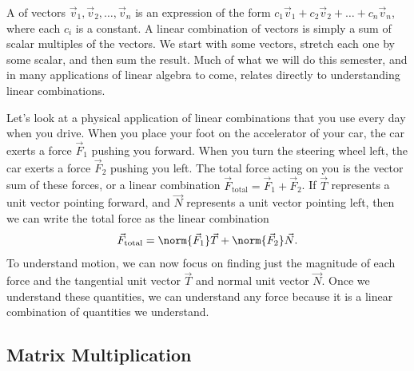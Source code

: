 A  of vectors $\vec v_{1}, \vec v_{2}, \ldots, \vec v_{n}$ is an expression of the form {$c_1\vec v_{1}+c_2\vec v_{2}+\ldots+c_n\vec v_{n}$}, where each {$c_i$} is a constant. 
A linear combination of vectors is simply a sum of scalar multiples of the vectors. 
We start with some vectors, stretch each one by some scalar, and then sum the result. 
Much of what we will do this semester, and in many applications of linear algebra to come, relates directly to understanding linear combinations.  

\begin{example}
Let's look at a physical application of linear combinations that you use every day when you drive.
When you place your foot on the accelerator of your car, the car exerts a force $\vec F_{1}$ pushing you forward. When you turn the steering wheel left, the car exerts a force $\vec F_{2}$ pushing you left. The total force acting on you is the vector sum of these forces, or a linear combination $\vec F_{\text{total}} = \vec F_1 +\vec F_2$. If $\vec T$ represents a unit vector pointing forward, and $\vec N$ represents a unit vector pointing left, then we can write the total force as the linear combination
$$\vec F_{\text{total}} = \norm{\vec F_1}\vec T +\norm{\vec F_2}\vec N.$$
To understand motion, we can now focus on finding just the magnitude of each force and the tangential unit vector $\vec T$ and normal unit vector $\vec N$.  Once we understand these quantities, we can understand any force because it is a linear combination of quantities we understand.
\end{example}

\subsection{Matrix Multiplication}

